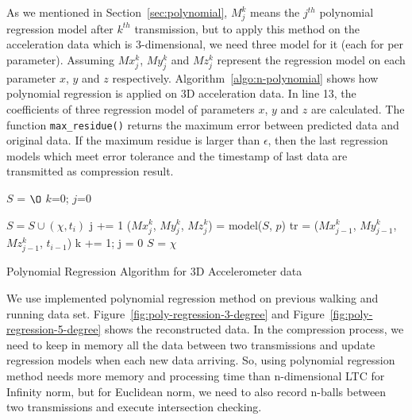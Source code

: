As we mentioned in Section~\ref{sec:polynomial}, $M_{j}^{k}$ means the $j^{th}$
polynomial regression model after $k^{th}$ transmission, but to apply this
method on the acceleration data which is 3-dimensional, we need three model for
it (each for per parameter). Assuming $Mx_{j}^{k}$, $My_{j}^{k}$ and
$Mz_{j}^{k}$ represent the regression model on each parameter $x$, $y$ and $z$
respectively. Algorithm~\ref{algo:n-polynomial} shows how polynomial regression
is applied on 3D acceleration data. In line 13, the coefficients of three
regression model of parameters $x$, $y$ and $z$ are calculated. The function
\texttt{max\_residue()} returns the maximum error between predicted data and
original data. If the maximum residue is larger than $\epsilon$, then the last
regression models which meet error tolerance and the timestamp of last data are
transmitted as compression result.
\begin{algorithm}
\begin{algorithmic}[1]
\Input
\EndInput
\Output
\EndOutput
\State $S$ = $\O$
\State $k$=0; $j$=0

    \State $S = S \cup (\chi, t_i)$
        \State j += 1
        \State ($Mx_{j}^{k}$, $My_{j}^{k}$, $Mz_{j}^{k}$) = model($S$, $p$)    
            \State tr = ($Mx_{j-1}^{k}$, $My_{j-1}^{k}$, $Mz_{j-1}^{k}$, $t_{i-1}$)
            \State k += 1; j = 0
            \State $S$ = $\chi$
        \EndIf
    \EndIf
\EndWhile

\end{algorithmic}
\caption{Polynomial Regression Algorithm for 3D Accelerometer data}
\label{algo:n-polynomial}
\end{algorithm}

We use implemented polynomial regression method on previous walking and running
data set. Figure~\ref{fig:poly-regression-3-degree} and
Figure~\ref{fig:poly-regression-5-degree} shows the reconstructed data. In the
compression process, we need to keep in memory all the data between two
transmissions and update regression models when each new data arriving. So,
using polynomial regression method needs more memory and processing time than
n-dimensional LTC for Infinity norm, but for Euclidean norm, we need to also
record n-balls between two transmissions and execute intersection checking. 

